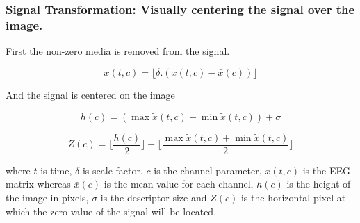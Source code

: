 \documentclass[aspectratio=169]{beamer}
\begin{document}
	\begin{frame}
	\frametitle{Signal Transformation: Visually centering the signal over the image.}
	\begin{center}

First the non-zero media is removed from the signal.
	
\begin{equation}
\tilde{x}(t,c) = \lfloor  \delta .(  x(t,c) - \bar{x}(c)  )   \rfloor 
\end{equation}
	
And the signal is centered on the image

\begin{equation}
h(c) = ( \max{} \tilde{x}(t,c) - \min{} \tilde{x}(t,c) ) + \sigma 
\end{equation}

\begin{equation}
Z(c) = \lfloor \frac{h(c)}{2} \rfloor - \lfloor \frac{\max{} \tilde{x}(t,c) + \min{} \tilde{x}(t,c)}{2} \rfloor 
\end{equation}

where $ t $ is time, $ \delta $ is scale factor,  $ c $ is the channel parameter, $ x(t,c) $ is the EEG matrix whereas $ \bar{x}(c) $ is the mean value for each channel,  $ h(c) $ is the height of the image in pixels, $ \sigma $ is the descriptor size and $ Z(c) $ is the horizontal pixel at which the zero value of the signal will be located.

	\end{center}
	\end{frame}
\end{document}

